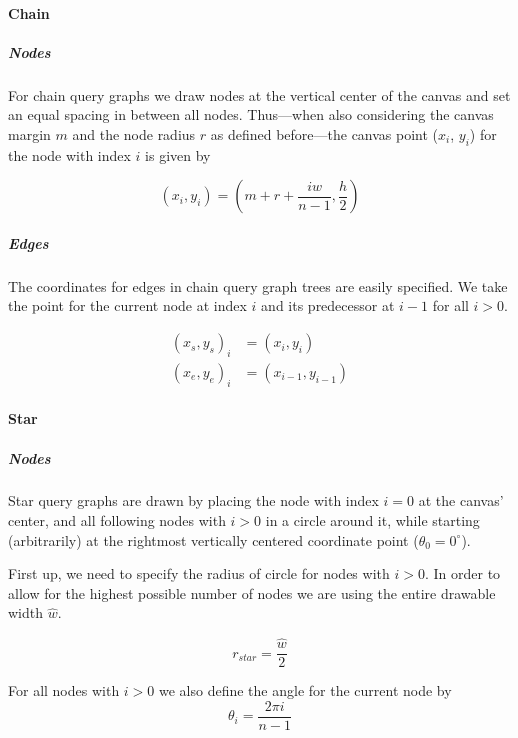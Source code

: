 \paragraph{Chain} 

\subparagraph{Nodes} For chain query graphs we draw nodes at the vertical center of the canvas and set an equal spacing in between all nodes. Thus—when also considering the canvas margin $m$ and the node radius $r$ as defined before—the canvas point ($x_i$, $y_i$) for the node with index $i$ is given by

\begin{equation}
    (x_i, y_i) = (m + r + \frac{i\hat{w}}{n - 1}, \frac{h}{2})
\end{equation}

\subparagraph{Edges}

The coordinates for edges in chain query graph trees are easily specified. We take the point for the current node at index $i$ and its predecessor at $i-1$ for all $i > 0$.

\begin{equation}
    \begin{aligned}
        (x_s, y_s)_i &= (x_i, y_i)\\   
        (x_e, y_e)_i &= (x_{i-1}, y_{i-1})
    \end{aligned}
\end{equation}

\paragraph{Star} 

\subparagraph{Nodes} Star query graphs are drawn by placing the node with index $i = 0$ at the canvas' center, and all following nodes with $i > 0$ in a circle around it, while starting (arbitrarily) at the rightmost vertically centered coordinate point ($\theta_0 = 0^{\circ}$).

First up, we need to specify the radius of circle for nodes with $i > 0$. In order to allow for the highest possible number of nodes we are using the entire drawable width $\hat{w}$.

\begin{equation}\label{eqn:painting-r_star}
    r_{star} = \frac{\hat{w}}{2}
\end{equation}

For all nodes with $i > 0$ we also define the angle for the current node by
\begin{equation}\label{eqn:painting-theta}
    \theta_i = \frac{2\pi i}{n - 1}
\end{equation}

